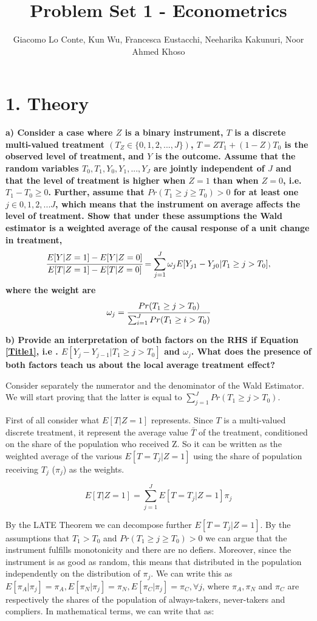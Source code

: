 \documentclass[a4paper,12pt,oneside,English]{article}
\title{Problem Set 1 - Econometrics}
\author{ Giacomo Lo Conte, Kun Wu, Francesca Eustacchi, Neeharika Kakunuri, Noor Ahmed Khoso }
\begin{document}
\maketitle
\section{1. Theory}
\textbf{a) Consider a case where $Z$ is a binary instrument, $T$ is a discrete multi-valued treatment $(T_Z \in \{0,1,2,...,J\})$, $T = Z T_1 + (1 - Z)T_0$ is the observed level of treatment, and $Y$ is the outcome. Assume that the random variables $T_0, T_1, Y_0, Y_1, . . . , Y_J$ are jointly independent of $J$ and that the level of treatment is higher when $Z = 1$ than when $Z = 0$, i.e. $T_1 - T_0 \geq 0$. Further, assume that $Pr(T_1 \geq j \geq T_0) > 0$ for at least one $j \in {0,1,2,...J}$, which means that the instrument on average affects the level of treatment. Show that under these assumptions the Wald estimator is a weighted average of the causal response of a unit change in treatment,}
\begin{equation}
\label{Title1}
    \cfrac{E[Y| Z = 1] - E[Y | Z = 0]}{E[T| Z = 1] - E[T| Z = 0]} = \sum^J_{j=1} \omega_j  E[Y_{j1} - Y_{j0}|T_1 \geq j > T_0],
\end{equation}
\textbf{where the weight are }
\begin{equation}
\label{Title2}
\omega_j = \cfrac{Pr(T_1\geq j > T_0)}{\sum^J_{i=1}Pr(T_1\geq i > T_0)}
\end{equation}


\textbf{b) Provide an interpretation of both factors on the RHS if Equation \eqref{Title1}, i.e . $E [Y_j - Y_{j−1}| T_1 \geq j > T_0]$
and $\omega_j$. What does the presence of both factors teach us about the local average treatment effect?}

Consider separately the numerator and the denominator of the Wald Estimator. We will start proving that the latter is equal to $\sum_{j=1}^J Pr(T_1\geq j>T_0)$.

First of all consider what $E[T|Z=1]$ represents. Since $T$ is a multi-valued discrete treatment, it represent the average value $\bar T$ of the treatment, conditioned on the share of the population who received Z. So it can be written as the weighted average of the various $E[T=T_j|Z=1]$ using the share of population receiving $T_j$ ($\pi_j$) as the weights.

\[
E[T|Z=1]=\sum_{j=1}^J E[T=T_j|Z=1] \pi_j
\]

By the LATE Theorem we can decompose further $E[T=T_j|Z=1]$. By the assumptions that $T_1>T_0$ and $Pr(T_1 \geq j \geq T_0) > 0$ we can argue that the instrument fulfills monotonicity and there are no defiers. Moreover, since the instrument is as good as random, this means that distributed in the population independently on the distribution of $\pi_j$. We can write this as $E[\pi_A|\pi_j]=\pi_A,E[\pi_N|\pi_j]=\pi_N,E[\pi_C|\pi_j]=\pi_C,\forall j$, where $\pi_A, \pi_N$ and $\pi_C$ are respectively the shares of the population of always-takers, never-takers and compliers. In mathematical terms, we can write that as:
\end{document}
